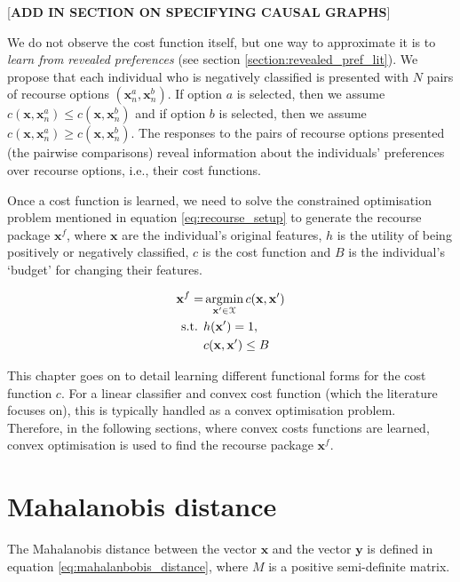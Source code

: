 [\textbf{ADD IN SECTION ON SPECIFYING CAUSAL GRAPHS}]

We do not observe the cost function itself, but one way to approximate it is to \textit{learn from revealed preferences} (see section \ref{section:revealed_pref_lit}). We propose that each individual who is negatively classified is presented with $N$ pairs of recourse options $(\textbf{x}_n^a,\textbf{x}_n^b)$. If option $a$ is selected, then we assume $c(\textbf{x}, \textbf{x}_n^a) \leq c(\textbf{x}, \textbf{x}_n^b)$ and if option $b$ is selected, then we assume $c(\textbf{x}, \textbf{x}_n^a) \geq c(\textbf{x}, \textbf{x}_n^b)$. The responses to the pairs of recourse options presented (the pairwise comparisons) reveal information about the individuals' preferences over recourse options, i.e., their cost functions.

Once a cost function is learned, we need to solve the constrained optimisation problem mentioned in equation \ref{eq:recourse_setup} to generate the recourse package $\textbf{x}^f$, where $\mathbf{x}$ are the individual's original features, $h$ is the utility of being positively or negatively classified, $c$ is the cost function and $B$ is the individual's `budget' for changing their features.

\begin{align}
	\mathbf{x}^f = & \operatorname*{argmin}_{\mathbf{x}' \in \mathbf{\mathcal{X}}} c(\mathbf{x},\mathbf{x}') \\
	\text{s.t. } & h(\mathbf{x}') = 1, \nonumber \\ 
	& c(\mathbf{x},\mathbf{x}') \leq B \nonumber
\end{align}

This chapter goes on to detail learning different functional forms for the cost function $c$. For a linear classifier and convex cost function (which the literature focuses on), this is typically handled as a convex optimisation problem. Therefore, in the following sections, where convex costs functions are learned, convex optimisation is used to find the recourse package $\textbf{x}^f$.


\section{Mahalanobis distance}

The Mahalanobis distance between the vector $\mathbf{x}$ and the vector $\mathbf{y}$ is defined in equation \ref{eq:mahalanbobis_distance}, where $M$ is a positive semi-definite matrix.


